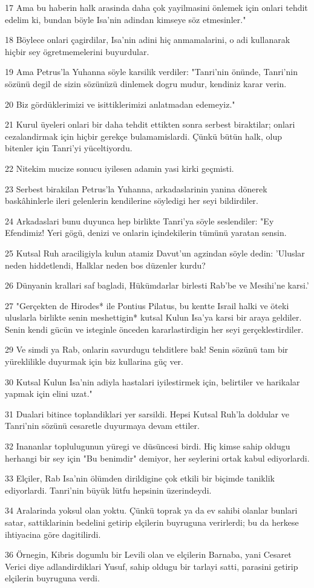 \par 17 Ama bu haberin halk arasinda daha çok yayilmasini önlemek için onlari tehdit edelim ki, bundan böyle Isa'nin adindan kimseye söz etmesinler."
\par 18 Böylece onlari çagirdilar, Isa'nin adini hiç anmamalarini, o adi kullanarak hiçbir sey ögretmemelerini buyurdular.
\par 19 Ama Petrus'la Yuhanna söyle karsilik verdiler: "Tanri'nin önünde, Tanri'nin sözünü degil de sizin sözünüzü dinlemek dogru mudur, kendiniz karar verin.
\par 20 Biz gördüklerimizi ve isittiklerimizi anlatmadan edemeyiz."
\par 21 Kurul üyeleri onlari bir daha tehdit ettikten sonra serbest biraktilar; onlari cezalandirmak için hiçbir gerekçe bulamamislardi. Çünkü bütün halk, olup bitenler için Tanri'yi yüceltiyordu.
\par 22 Nitekim mucize sonucu iyilesen adamin yasi kirki geçmisti.
\par 23 Serbest birakilan Petrus'la Yuhanna, arkadaslarinin yanina dönerek baskâhinlerle ileri gelenlerin kendilerine söyledigi her seyi bildirdiler.
\par 24 Arkadaslari bunu duyunca hep birlikte Tanri'ya söyle seslendiler: "Ey Efendimiz! Yeri gögü, denizi ve onlarin içindekilerin tümünü yaratan sensin.
\par 25 Kutsal Ruh araciligiyla kulun atamiz Davut'un agzindan söyle dedin: 'Uluslar neden hiddetlendi, Halklar neden bos düzenler kurdu?
\par 26 Dünyanin krallari saf bagladi, Hükümdarlar birlesti Rab'be ve Mesihi'ne karsi.'
\par 27 "Gerçekten de Hirodes* ile Pontius Pilatus, bu kentte Israil halki ve öteki uluslarla birlikte senin meshettigin* kutsal Kulun Isa'ya karsi bir araya geldiler. Senin kendi gücün ve isteginle önceden kararlastirdigin her seyi gerçeklestirdiler.
\par 29 Ve simdi ya Rab, onlarin savurdugu tehditlere bak! Senin sözünü tam bir yüreklilikle duyurmak için biz kullarina güç ver.
\par 30 Kutsal Kulun Isa'nin adiyla hastalari iyilestirmek için, belirtiler ve harikalar yapmak için elini uzat."
\par 31 Dualari bitince toplandiklari yer sarsildi. Hepsi Kutsal Ruh'la doldular ve Tanri'nin sözünü cesaretle duyurmaya devam ettiler.
\par 32 Inananlar toplulugunun yüregi ve düsüncesi birdi. Hiç kimse sahip oldugu herhangi bir sey için "Bu benimdir" demiyor, her seylerini ortak kabul ediyorlardi.
\par 33 Elçiler, Rab Isa'nin ölümden dirildigine çok etkili bir biçimde taniklik ediyorlardi. Tanri'nin büyük lütfu hepsinin üzerindeydi.
\par 34 Aralarinda yoksul olan yoktu. Çünkü toprak ya da ev sahibi olanlar bunlari satar, sattiklarinin bedelini getirip elçilerin buyruguna verirlerdi; bu da herkese ihtiyacina göre dagitilirdi.
\par 36 Örnegin, Kibris dogumlu bir Levili olan ve elçilerin Barnaba, yani Cesaret Verici diye adlandirdiklari Yusuf, sahip oldugu bir tarlayi satti, parasini getirip elçilerin buyruguna verdi.

